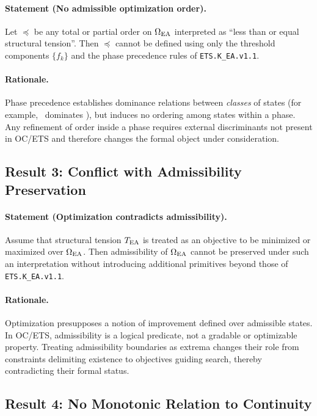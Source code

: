 \paragraph{Statement (No admissible optimization order).}
Let $\preceq$ be any total or partial order on $\Omega_{\mathrm{EA}}$ interpreted as
``less than or equal structural tension''. Then $\preceq$ cannot be
defined using only the threshold components $\{f_k\}$ and the phase
precedence rules of \texttt{ETS.K\_EA.v1.1}.

\paragraph{Rationale.}
Phase precedence establishes dominance relations between \emph{classes}
of states (for example, \PHASESTOP\ dominates \PHASECOLLAPSE), but induces
no ordering among states within a phase. Any refinement of order inside a
phase requires external discriminants not present in OC/ETS and
therefore changes the formal object under consideration.

\subsection{Result 3: Conflict with Admissibility Preservation}

\paragraph{Statement (Optimization contradicts admissibility).}
Assume that structural tension $T_{\mathrm{EA}}$ is treated as an objective to be
minimized or maximized over $\Omega_{\mathrm{EA}}$. Then admissibility of $\Omega_{\mathrm{EA}}$
cannot be preserved under such an interpretation without introducing
additional primitives beyond those of \texttt{ETS.K\_EA.v1.1}.

\paragraph{Rationale.}
Optimization presupposes a notion of improvement defined over admissible
states. In OC/ETS, admissibility is a logical predicate, not a gradable or
optimizable property. Treating admissibility boundaries as extrema
changes their role from constraints delimiting existence to objectives
guiding search, thereby contradicting their formal status.

\subsection{Result 4: No Monotonic Relation to Continuity}


